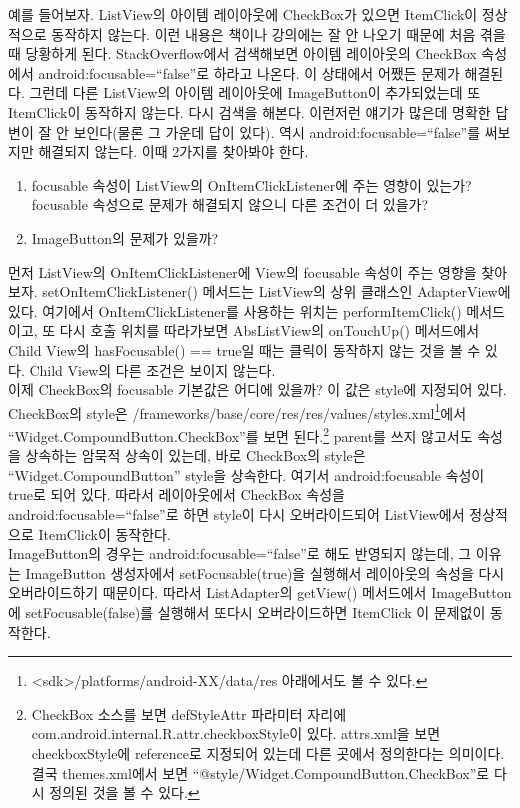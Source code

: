 예를 들어보자.
ListView의 아이템 레이아웃에 CheckBox가 있으면 ItemClick이 정상적으로 동작하지 않는다. 이런 내용은 책이나 강의에는 잘 안 나오기 때문에 처음 겪을 때 당황하게 된다. 
StackOverflow에서 검색해보면 아이템 레이아웃의 CheckBox 속성에서 android:focusable=``false''로 하라고 나온다. 이 상태에서 어쨌든 문제가 해결된다.
그런데 다른 ListView의 아이템 레이아웃에 ImageButton이 추가되었는데 또 ItemClick이 동작하지 않는다. 다시 검색을 해본다. 이런저런 얘기가 많은데 명확한 답변이 잘 안 보인다(물론 그 가운데 답이 있다). 역시 android:focusable=``false''를 써보지만 해결되지 않는다. 이때 2가지를 찾아봐야 한다. 
\begin{enumerate}
\item focusable 속성이 ListView의 OnItemClickListener에 주는 영향이 있는가? focusable 속성으로 문제가 해결되지 않으니 다른 조건이 더 있을가?
\item ImageButton의 문제가 있을까?
\end{enumerate}

먼저 ListView의 OnItemClickListener에 View의 focusable 속성이 주는 영향을 찾아보자. setOnItemClickListener() 메서드는 ListView의 상위 클래스인 AdapterView에 있다. 
여기에서 OnItemClickListener를 사용하는 위치는 performItemClick() 메서드이고, 또 다시 호출 위치를 따라가보면 AbsListView의 onTouchUp() 메서드에서 Child View의 hasFocusable() == true일 때는 클릭이 동작하지 않는 것을 볼 수 있다. Child View의 다른 조건은 보이지 않는다.\\

이제 CheckBox의 focusable 기본값은 어디에 있을까? 이 값은 style에 지정되어 있다.
CheckBox의 style은 /frameworks/base/core/res/res/values/styles.xml\footnote{<sdk>/platforms/android-XX/data/res 아래에서도 볼 수 있다.}에서 ``Widget.CompoundButton.CheckBox''를 보면 된다.\footnote{CheckBox 소스를 보면 defStyleAttr 파라미터 자리에 com.android.internal.R.attr.checkboxStyle이 있다. attrs.xml을 보면 checkboxStyle에 reference로 지정되어 있는데 다른 곳에서 정의한다는 의미이다. 결국 themes.xml에서 보면 ``@style/Widget.CompoundButton.CheckBox''로 다시 정의된 것을 볼 수 있다.}
parent를 쓰지 않고서도 속성을 상속하는 암묵적 상속이 있는데, 바로 CheckBox의 style은 ``Widget.CompoundButton'' style을 상속한다. 여기서 android:focusable 속성이 true로 되어 있다.
따라서 레이아웃에서 CheckBox 속성을 android:focusable=``false''로 하면 style이 다시 오버라이드되어 ListView에서 정상적으로 ItemClick이 동작한다.\\

ImageButton의 경우는 android:focusable=``false''로 해도 반영되지 않는데, 그 이유는 ImageButton 생성자에서 setFocusable(true)을 실행해서 레이아웃의 속성을 다시 오버라이드하기 때문이다. 따라서 ListAdapter의 getView() 메서드에서 ImageButton에 setFocusable(false)를 실행해서 또다시 오버라이드하면 ItemClick 이 문제없이 동작한다.\\

